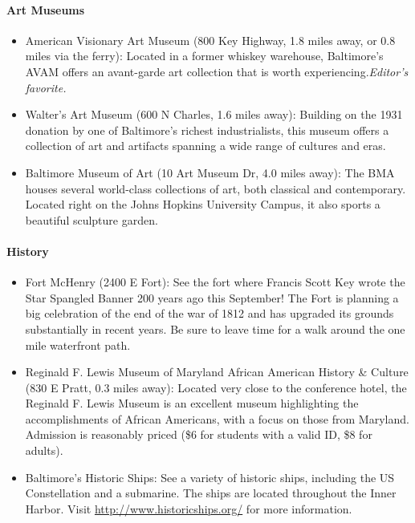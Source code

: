 \paragraph*{Art Museums}
\begin{itemize}
\item{American Visionary Art Museum (800 Key Highway, 1.8 miles away, or 0.8 miles via the ferry): Located in a former whiskey warehouse, Baltimore's AVAM offers an avant-garde art collection that is worth experiencing.\it{Editor's favorite}.}
\item{Walter's Art Museum (600 N Charles, 1.6 miles away): Building on the 1931 donation by one of Baltimore's richest industrialists, this museum offers a collection of art and artifacts spanning a wide range of cultures and eras.}
\item{Baltimore Museum of Art (10 Art Museum Dr, 4.0 miles away): The BMA houses several world-class collections of art, both classical and contemporary. Located right on the Johns Hopkins University Campus, it also sports a beautiful sculpture garden.}
\end{itemize}

\paragraph*{History}
\begin{itemize}
\item{Fort McHenry (2400 E Fort): See the fort where Francis Scott Key wrote the Star Spangled Banner 200 years ago this September! The Fort is planning a big celebration of the end of the war of 1812 and has upgraded its grounds substantially in recent years. Be sure to leave time for a walk around the one mile waterfront path.}
\item{Reginald F. Lewis Museum of Maryland African American History \& Culture (830 E Pratt, 0.3 miles away): Located very close to the conference hotel, the Reginald F. Lewis Museum is an excellent museum highlighting the accomplishments of African Americans, with a focus on those from Maryland. Admission is reasonably priced (\$6 for students with a valid ID, \$8 for adults).}
\item{Baltimore's Historic Ships: See a variety of historic ships, including the US Constellation and a submarine. The ships are located throughout the Inner Harbor. Visit \url{http://www.historicships.org/} for more information.}
\end{itemize}

